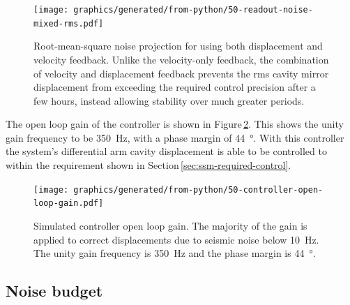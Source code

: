\begin{figure}
  \centering
  \texttt{[image: graphics/generated/from-python/50-readout-noise-mixed-rms.pdf]}
  \caption[Root-mean-square noise projection for \LMINUS{} using both displacement and velocity feedback]{\label{fig:readout-noise-mixed-rms}Root-mean-square noise projection for \LMINUS{} using both displacement and velocity feedback. Unlike the velocity-only feedback, the combination of velocity and displacement feedback prevents the rms cavity mirror displacement from exceeding the required control precision after a few hours, instead allowing stability over much greater periods.}
\end{figure}

The open loop gain of the controller is shown in Figure\,\ref{fig:open-loop-gain}. This shows the unity gain frequency to be \SI{350}{\hertz}, with a phase margin of \SI{44}{\degree}. With this controller the system's differential arm cavity displacement is able to be controlled to within the requirement shown in Section\,\ref{sec:ssm-required-control}.

\begin{figure}
  \texttt{[image: graphics/generated/from-python/50-controller-open-loop-gain.pdf]}
  \caption[Simulated controller open loop gain]{\label{fig:open-loop-gain}Simulated \SSM{} controller open loop gain. The majority of the gain is applied to correct displacements due to seismic noise below \SI{10}{\hertz}. The unity gain frequency is \SI{350}{\hertz} and the phase margin is \SI{44}{\degree}.}
\end{figure}

\subsection{\label{sec:noise-budget}Noise budget}

